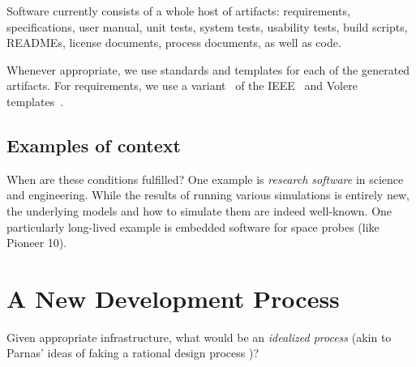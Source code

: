 \documentclass[sigconf,review,anonymous=false]{acmart}
\begin{document}
Software currently consists of a whole host of artifacts: requirements,
specifications, user manual, unit tests, system tests, usability tests,
build scripts, READMEs, license documents, process documents, as well as
code.

Whenever appropriate, we use standards and templates for each of the
generated artifacts. For requirements, we use a variant~\cite{SmithEtAl2007}
of the IEEE~\cite{IEEE1998}
and Volere templates~\cite{RobertsonAndRobertson1999Vol}.

\subsection{Examples of context}

When are these conditions fulfilled? One example is
\emph{research software} in science and engineering. While the results of
running various simulations is entirely new, the underlying models and
how to simulate them are indeed well-known. One particularly long-lived
example is embedded software for space probes (like Pioneer 10).

\section{A New Development Process}\label{ch:process}

Given appropriate infrastructure, what would be an \emph{idealized process}
(akin to Parnas' ideas of faking a rational design process \cite{Parnas1986})?
\end{document}
